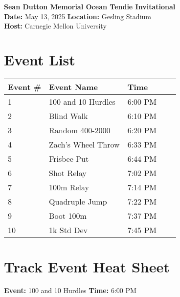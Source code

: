 \documentclass[11pt]{article}
\begin{document}
\begin{center}
    \LARGE \textbf{Sean Dutton Memorial Ocean Tendie Invitational} \\
    \large
    \vspace{0.5em}
    \textbf{Date:} May 13, 2025 \hspace{2cm} \textbf{Location:} Gesling Stadium \\
    \textbf{Host:} Carnegie Mellon University
\end{center}

\vspace{1em}

\section*{Event List}

\begin{tabular}{@{}lllll@{}}
\toprule
\textbf{Event \#} & \textbf{Event Name} &  \textbf{Time} \\
\midrule
1 & 100 and 10 Hurdles & 6:00 PM \\
2 & Blind Walk & 6:10 PM \\
3 & Random 400-2000 & 6:20 PM \\
4 & Zach's Wheel Throw & 6:33 PM \\
5 & Frisbee Put & 6:44 PM \\
6 & Shot Relay & 7:02 PM \\
7 & 100m Relay & 7:14 PM \\
8 & Quadruple Jump & 7:22 PM \\
9 & Boot 100m & 7:37 PM \\
10 & 1k Std Dev & 7:45 PM \\
\bottomrule
\end{tabular}



\vspace{2em}

\section*{Track Event Heat Sheet}


\textbf{Event:} 100 and 10 Hurdles \quad \textbf{Time:} 6:00 PM 
\end{document}
